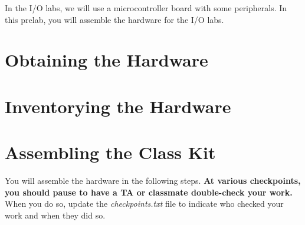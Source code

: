 





\renewcommand{\labnumber}{\ioprelabnumber}
\renewcommand{\labname}{Physical Assembly of Hardware for I/O Labs}
\renewcommand{\shortlabname}{i/o-prelab}
\renewcommand{\collaborationrules}{\ioprelabcollaboration}
\renewcommand{\duedate}{\ioprelabdue}


\pagelayout

\labidentifier

In the I/O labs, we will use a microcontroller board with some peripherals.
In this prelab, you will assemble the hardware for the I/O labs.

\section{Obtaining the Hardware} \obtaininghardware

\section{Inventorying the Hardware} \label{sec:inventory} 

\vspace{0.5cm}

\section*{Assembling the Class Kit}

    You will assemble the hardware in the following steps.
    \textbf{At various checkpoints, you should pause to have a TA or classmate double-check your work.}
    When you do so, update the \textit{checkpoints.txt} file to indicate who checked your work and when they did so.

